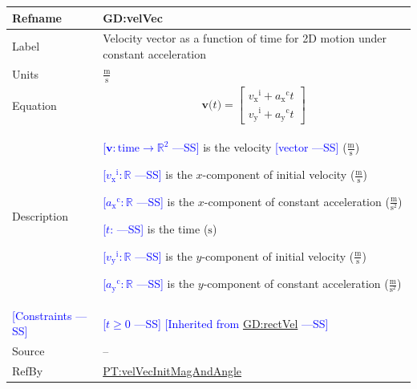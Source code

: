 \documentclass[12pt]{article}
\newcommand{\authornote}[3]{\textcolor{#1}{[#3 ---#2]}}
\newcommand{\authornote}[3]{}
\newcommand{\wss}[1]{\authornote{blue}{SS}{#1}}
\begin{document}
\noindent
\begin{minipage}{\textwidth}
\begin{tabular}{>{\raggedright}p{}>{\raggedright\arraybackslash}p{}}
\toprule \textbf{Refname} & \textbf{GD:velVec}
\label{GD:velVec}
\\ \midrule
Label & Velocity vector as a function of time for 2D motion under constant acceleration
        
\\ \midrule
Units & $\frac{\text{m}}{\text{s}}$
        
\\ \midrule
Equation & \begin{displaymath}
           \symbf{v}\text{(}t\text{)}=\begin{bmatrix}
                                      {{v_{\text{x}}}^{\text{i}}}+{{a_{\text{x}}}^{\text{c}}} t\\
                                      {{v_{\text{y}}}^{\text{i}}}+{{a_{\text{y}}}^{\text{c}}} t
                                      \end{bmatrix}
           \end{displaymath}
\\ \midrule
Description & \begin{symbDescription}
              \item{\wss{$\symbf{v}: \text{time} \rightarrow \mathbb{R}^2$} is the velocity \wss{vector} ($\frac{\text{m}}{\text{s}}$)}
              \item{\wss{${{v_{\text{x}}}^{\text{i}}}: \mathbb{R}$} is the $x$-component of initial velocity ($\frac{\text{m}}{\text{s}}$)}
              \item{\wss{${{a_{\text{x}}}^{\text{c}}}: \mathbb{R}$} is the $x$-component of constant acceleration ($\frac{\text{m}}{\text{s}^{2}}$)}
              \item{\wss{$t$: \text{time}} is the time (${\text{s}}$)}
              \item{\wss{${{v_{\text{y}}}^{\text{i}}}: \mathbb{R}$} is the $y$-component of initial velocity ($\frac{\text{m}}{\text{s}}$)}
              \item{\wss{${{a_{\text{y}}}^{\text{c}}}: \mathbb{R}$} is the $y$-component of constant acceleration ($\frac{\text{m}}{\text{s}^{2}}$)}
              \end{symbDescription}
\\ \midrule

\wss{Constraints} & \wss{$t \geq 0$} \wss{Inherited from
\hyperref[GD:rectVel]{GD:rectVel}}
\\ \midrule

Source & --
         
\\ \midrule
RefBy & \hyperref[PT:velVecInitMagAndAngle]{PT:velVecInitMagAndAngle}
\\ \bottomrule
\end{tabular}
\end{minipage}
\end{document}
